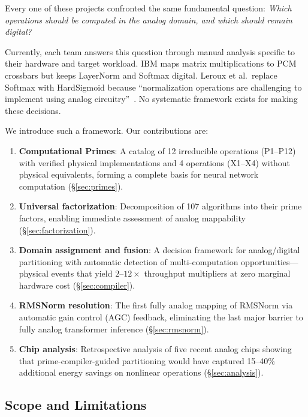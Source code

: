\documentclass[11pt]{article}
\begin{document}
Every one of these projects confronted the same fundamental question: \textit{Which operations should be computed in the analog domain, and which should remain digital?}

Currently, each team answers this question through manual analysis specific to their hardware and target workload. IBM maps matrix multiplications to PCM crossbars but keeps LayerNorm and Softmax digital. Leroux et al.\ replace Softmax with HardSigmoid because ``normalization operations are challenging to implement using analog circuitry''~\cite{leroux2025a}. No systematic framework exists for making these decisions.

We introduce such a framework. Our contributions are:

\begin{enumerate}[leftmargin=*]
\item \textbf{Computational Primes}: A catalog of 12 irreducible operations (P1--P12) with verified physical implementations and 4 operations (X1--X4) without physical equivalents, forming a complete basis for neural network computation (\S\ref{sec:primes}).

\item \textbf{Universal factorization}: Decomposition of 107 algorithms into their prime factors, enabling immediate assessment of analog mappability (\S\ref{sec:factorization}).

\item \textbf{Domain assignment and fusion}: A decision framework for analog/digital partitioning with automatic detection of multi-computation opportunities---physical events that yield $2$--$12\times$ throughput multipliers at zero marginal hardware cost (\S\ref{sec:compiler}).

\item \textbf{RMSNorm resolution}: The first fully analog mapping of RMSNorm via automatic gain control (AGC) feedback, eliminating the last major barrier to fully analog transformer inference (\S\ref{sec:rmsnorm}).

\item \textbf{Chip analysis}: Retrospective analysis of five recent analog chips showing that prime-compiler-guided partitioning would have captured 15--40\% additional energy savings on nonlinear operations (\S\ref{sec:analysis}).
\end{enumerate}

\subsection{Scope and Limitations}
\end{document}
